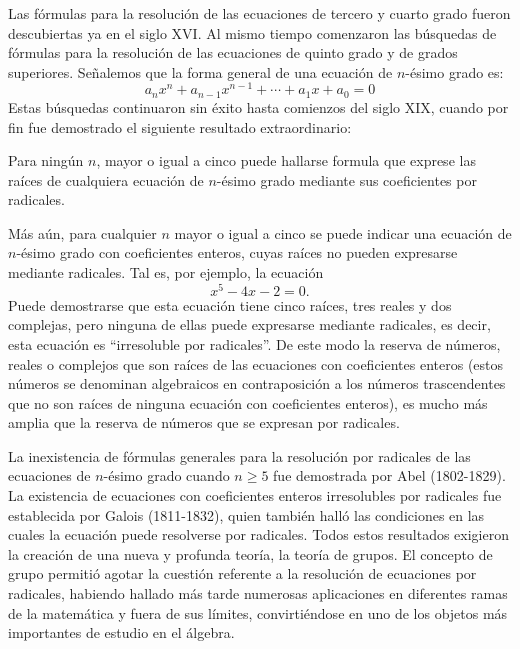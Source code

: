 Las fórmulas para la resolución de las ecuaciones de tercero y cuarto grado fueron descubiertas ya en el siglo XVI. Al mismo tiempo comenzaron las búsquedas de fórmulas para la resolución de las ecuaciones de quinto grado y de grados superiores. Señalemos que la forma general de una ecuación de $n$-ésimo grado es:
$$a_nx^n+a_{n-1}x^{n-1}+\cdots +a_1 x+a_0 = 0$$
Estas búsquedas continuaron sin éxito hasta comienzos del siglo XIX, cuando por fin fue demostrado el siguiente resultado extraordinario:
\begin{tcolorbox}[
    theorem style=change apart,
    enhanced,
    lower separated=false,
    breakable,
    boxrule=0pt,
    frame hidden,
    colback=black!7!white,
    coltitle=black,
    boxed title style={colframe=white, colback=white, boxrule=0pt},
    fontupper=\normalsize,
    before upper={\abovedisplayskip=8pt\belowdisplayskip=8pt},
    left=1mm,
    right=1mm,
    top=1mm,
    bottom=1mm,
    sharp corners,
]
    Para ningún $n$, mayor o igual a cinco puede hallarse formula que exprese las raíces de cualquiera ecuación de $n$-ésimo grado mediante sus coeficientes por radicales.
\end{tcolorbox}

Más aún, para cualquier $n$ mayor o igual a cinco se puede indicar una ecuación de $n$-ésimo grado con coeficientes enteros, cuyas raíces no pueden expresarse mediante radicales. Tal es, por ejemplo, la ecuación
$$x^5 - 4x - 2 = 0.$$
Puede demostrarse que esta ecuación tiene cinco raíces, tres reales y dos complejas, pero ninguna de ellas puede expresarse mediante radicales, es decir, esta ecuación es “irresoluble por radicales”. De este modo la reserva de números, reales o complejos que son raíces de las ecuaciones con coeficientes enteros (estos números se denominan algebraicos en contraposición a los números trascendentes que no son raíces de ninguna ecuación con coeficientes enteros), es mucho más amplia que la reserva de números que se expresan por radicales.

La inexistencia de fórmulas generales para la resolución por radicales de las ecuaciones de $n$-ésimo grado cuando $n \geq 5$ fue demostrada por Abel (1802-1829). La existencia de ecuaciones con coeficientes enteros irresolubles por radicales fue establecida por Galois (1811-1832), quien también halló las condiciones en las cuales la ecuación puede resolverse por radicales. Todos estos resultados exigieron la creación de una nueva y profunda teoría, la teoría de grupos. El concepto de grupo permitió agotar la cuestión referente a la resolución de ecuaciones por radicales, habiendo hallado más tarde numerosas aplicaciones en diferentes ramas de la matemática y fuera de sus límites, convirtiéndose en uno de los objetos más importantes de estudio en el álgebra.

